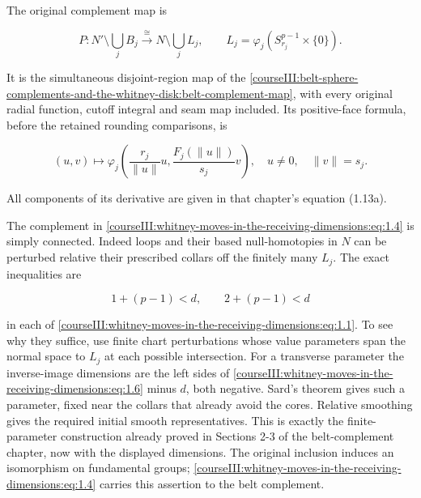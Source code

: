 The original complement map is

\begin{equation}
P:N'\setminus\bigcup_j B_j
    \xrightarrow{\ \cong\ }
    N\setminus\bigcup_jL_j,\qquad
 L_j=\varphi_j(S^{p-1}_{r_j}\times\{0\}).
 \label{courseIII:whitney-moves-in-the-receiving-dimensions:eq:1.4}
\end{equation}

It is the simultaneous disjoint-region map of the \cref{courseIII:belt-sphere-complements-and-the-whitney-disk:belt-complement-map}, with every original radial function, cutoff integral and seam map included. Its positive-face formula, before the retained rounding comparisons, is

\begin{equation}
(u,v)\longmapsto
 \varphi_j\left(\frac{r_j}{\|u\|}u,
               \frac{F_j(\|u\|)}{s_j}v\right),
 \quad u\ne0,\quad\|v\|=s_j.
 \label{courseIII:whitney-moves-in-the-receiving-dimensions:eq:1.5}
\end{equation}

All components of its derivative are given in that chapter's equation (1.13a).

The complement in \eqref{courseIII:whitney-moves-in-the-receiving-dimensions:eq:1.4} is simply connected. Indeed loops and their based null-homotopies in \(N\) can be perturbed relative their prescribed collars off the finitely many \(L_j\). The exact inequalities are

\begin{equation}
1+(p-1)<d,\qquad 2+(p-1)<d
 \label{courseIII:whitney-moves-in-the-receiving-dimensions:eq:1.6}
\end{equation}

in each of \eqref{courseIII:whitney-moves-in-the-receiving-dimensions:eq:1.1}. To see why they suffice, use finite chart perturbations whose value parameters span the normal space to \(L_j\) at each possible intersection. For a transverse parameter the inverse-image dimensions are the left sides of \eqref{courseIII:whitney-moves-in-the-receiving-dimensions:eq:1.6} minus \(d\), both negative. Sard's theorem gives such a parameter, fixed near the collars that already avoid the cores. Relative smoothing gives the required initial smooth representatives. This is exactly the finite-parameter construction already proved in Sections 2-3 of the belt-complement chapter, now with the displayed dimensions. The original inclusion induces an isomorphism on fundamental groups; \eqref{courseIII:whitney-moves-in-the-receiving-dimensions:eq:1.4} carries this assertion to the belt complement.

